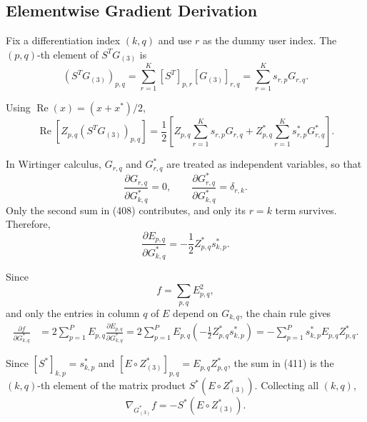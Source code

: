 \documentclass[12pt,a4paper]{article}
\begin{document}
\subsection{Elementwise Gradient Derivation}

Fix a differentiation index $(k,q)$ and use $r$ as the dummy user
index. The $(p,q)$-th element of $S^TG_{(3)}$ is
\begin{equation}
(S^TG_{(3)})_{p,q}
=
\sum_{r=1}^{K}[S^T]_{p,r}[G_{(3)}]_{r,q}
=
\sum_{r=1}^{K}s_{r,p}G_{r,q}.
\tag{407}
\end{equation}

Using $\operatorname{Re}(x)=(x+x^*)/2$,
\begin{equation}
\operatorname{Re}\!\left[
Z_{p,q}(S^TG_{(3)})_{p,q}
\right]
=
\frac12
\left[
Z_{p,q}\sum_{r=1}^{K}s_{r,p}G_{r,q}
+Z_{p,q}^{*}\sum_{r=1}^{K}s_{r,p}^{*}G_{r,q}^{*}
\right].
\tag{408}
\end{equation}

In Wirtinger calculus, $G_{r,q}$ and $G_{r,q}^{*}$ are treated as
independent variables, so that
\[
\frac{\partial G_{r,q}}{\partial G_{k,q}^{*}}=0,
\qquad
\frac{\partial G_{r,q}^{*}}{\partial G_{k,q}^{*}}=\delta_{r,k}.
\]
Only the second sum in (408) contributes, and only its $r=k$ term
survives. Therefore,
\begin{equation}
\boxed{
\frac{\partial E_{p,q}}
{\partial G_{k,q}^{*}}
=
-\frac12 Z_{p,q}^{*}s_{k,p}^{*}.
}
\tag{409}
\end{equation}

Since
\begin{equation}
f=\sum_{p,q}E_{p,q}^{2},
\tag{410}
\end{equation}
and only the entries in column $q$ of $E$ depend on $G_{k,q}$, the
chain rule gives
\begin{equation}
\begin{aligned}
\frac{\partial f}
{\partial G_{k,q}^{*}}
&=
2\sum_{p=1}^{P}
E_{p,q}
\frac{\partial E_{p,q}}
{\partial G_{k,q}^{*}}
=
2\sum_{p=1}^{P}
E_{p,q}
\left(-\frac12 Z_{p,q}^{*}s_{k,p}^{*}\right)
=
-\sum_{p=1}^{P}
s_{k,p}^{*}E_{p,q}Z_{p,q}^{*}.
\end{aligned}
\tag{411}
\end{equation}

Since $[S^{*}]_{k,p}=s_{k,p}^{*}$ and $[E\circ Z_{(3)}^{*}]_{p,q}=E_{p,q}Z_{p,q}^{*}$,
the sum in (411) is the $(k,q)$-th element of the matrix product
$S^{*}(E\circ Z_{(3)}^{*})$. Collecting all $(k,q)$,
\begin{equation}
\boxed{
\nabla_{G_{(3)}^{*}}f
=
-S^{*}\left(E\circ Z_{(3)}^{*}\right).
}
\tag{412}
\end{equation}
\end{document}
